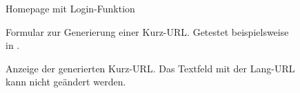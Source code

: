 \documentclass[parskip=full,11pt,twoside]{scrartcl}
\begin{document}
\begin{figure}[hb]
\caption{\label{fig:homepage}
Homepage mit Login-Funktion
}
\end{figure}

\begin{figure}[hb]
\caption{\label{fig:form}
Formular zur Generierung einer Kurz-URL.
Getestet beispielsweise in .
}
\end{figure}

\begin{figure}[hb]
\caption{\label{fig:generated}
Anzeige der generierten Kurz-URL.
Das Textfeld mit der Lang-URL kann nicht geändert werden.
}
\end{figure}
\end{document}
